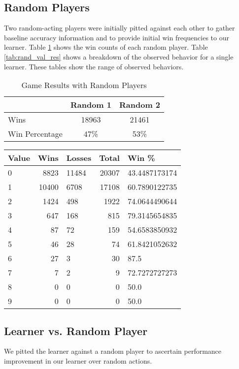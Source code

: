 \documentclass[12pt,pdftex,twocolumn]{article}
\begin{document}
\subsection{Random Players}
Two random-acting players were initially pitted against each other to gather baseline accuracy information and to provide initial win frequencies to our learner. Table \ref{tab:rand_res} shows the win counts of each random player. Table \ref{tab:rand_val_res} shows a breakdown of the observed behavior for a single learner. These tables show the range of observed behaviors.
\begin{table}[hb]
\centering
\begin{tabular}{| l | c | c |}
	\hline
& \textbf{Random 1} & \textbf{Random 2}\\
\hline
Wins & 18963 & 21461\\ %
	\hline
Win Percentage & 47\% &53\% \\
\hline
\end{tabular}
\caption{Game Results with Random Players}
\label{tab:rand_res}
\end{table}

\begin{table*}[hb]
\centering
\begin{tabular}{| l | r | l | r | l |}
	\hline
 \textbf{Value} & \textbf{Wins}& \textbf{Losses}& \textbf{Total}& \textbf{Win \%}\\
\hline
0& 8823& 11484& 20307& 43.4487173174\\
1& 10400& 6708& 17108& 60.7890122735\\
2& 1424& 498& 1922& 74.0644490644\\
3& 647& 168& 815& 79.3145654835\\
4& 87& 72& 159& 54.6583850932\\
5& 46& 28& 74& 61.8421052632\\
6& 27& 3& 30& 87.5\\
7& 7& 2& 9& 72.7272727273\\
8& 0& 0& 0& 50.0\\
9& 0& 0& 0& 50.0\\
\hline
\end{tabular}
\caption{Game Results with Random Players by Value}
\label{tab:rand_val_res}
\end{table*}

\subsection{Learner vs. Random Player}
We pitted the learner against a random player to ascertain performance improvement in our learner over random actions.
\end{document}
